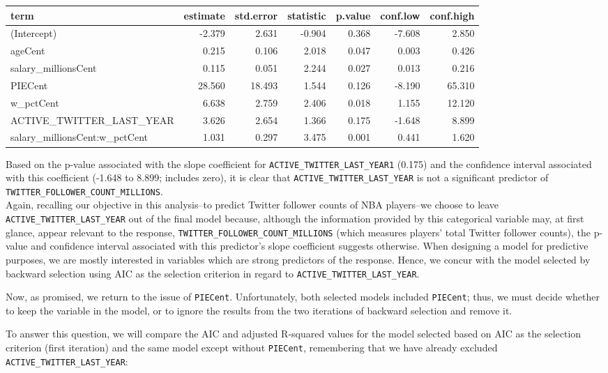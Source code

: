 \documentclass[]{article}
\begin{document}
\begin{longtable}[]{@{}lrrrrrr@{}}
\toprule
term & estimate & std.error & statistic & p.value & conf.low &
conf.high\tabularnewline
\midrule
\endhead
(Intercept) & -2.379 & 2.631 & -0.904 & 0.368 & -7.608 &
2.850\tabularnewline
ageCent & 0.215 & 0.106 & 2.018 & 0.047 & 0.003 & 0.426\tabularnewline
salary\_millionsCent & 0.115 & 0.051 & 2.244 & 0.027 & 0.013 &
0.216\tabularnewline
PIECent & 28.560 & 18.493 & 1.544 & 0.126 & -8.190 &
65.310\tabularnewline
w\_pctCent & 6.638 & 2.759 & 2.406 & 0.018 & 1.155 &
12.120\tabularnewline
ACTIVE\_TWITTER\_LAST\_YEAR & 3.626 & 2.654 & 1.366 & 0.175 & -1.648 &
8.899\tabularnewline
salary\_millionsCent:w\_pctCent & 1.031 & 0.297 & 3.475 & 0.001 & 0.441
& 1.620\tabularnewline
\bottomrule
\end{longtable}

Based on the p-value associated with the slope coefficient for
\texttt{ACTIVE\_TWITTER\_LAST\_YEAR1} (0.175) and the confidence
interval associated with this coefficient (-1.648 to 8.899; includes
zero), it is clear that \texttt{ACTIVE\_TWITTER\_LAST\_YEAR} is not a
significant predictor of \texttt{TWITTER\_FOLLOWER\_COUNT\_MILLIONS}.\\
Again, recalling our objective in this analysis--to predict Twitter
follower counts of NBA players--we choose to leave
\texttt{ACTIVE\_TWITTER\_LAST\_YEAR} out of the final model because,
although the information provided by this categorical variable may, at
first glance, appear relevant to the response,
\texttt{TWITTER\_FOLLOWER\_COUNT\_MILLIONS} (which measures players'
total Twitter follower counts), the p-value and confidence interval
associated with this predictor's slope coefficient suggests otherwise.
When designing a model for predictive purposes, we are mostly interested
in variables which are strong predictors of the response. Hence, we
concur with the model selected by backward selection using AIC as the
selection criterion in regard to \texttt{ACTIVE\_TWITTER\_LAST\_YEAR}.

Now, as promised, we return to the issue of \texttt{PIECent}.
Unfortunately, both selected models included \texttt{PIECent}; thus, we
must decide whether to keep the variable in the model, or to ignore the
results from the two iterations of backward selection and remove it.

To answer this question, we will compare the AIC and adjusted R-squared
values for the model selected based on AIC as the selection criterion
(first iteration) and the same model except without \texttt{PIECent},
remembering that we have already excluded
\texttt{ACTIVE\_TWITTER\_LAST\_YEAR}:
\end{document}
